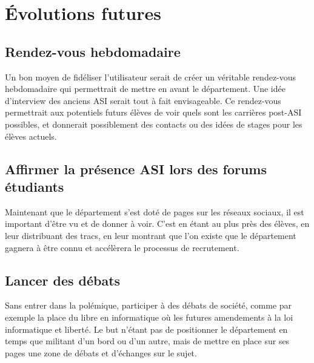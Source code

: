 \section{Évolutions futures}
\subsection{Rendez-vous hebdomadaire}
	Un bon moyen de fidéliser l'utilisateur serait de créer un véritable rendez-vous hebdomadaire qui permettrait de mettre en avant le département. 
	Une idée d'interview des anciens ASI serait tout à fait envisageable. Ce rendez-vous permettrait aux potentiels futurs élèves de voir quels sont les carrières post-ASI possibles, et donnerait possiblement des contacts ou des idées de stages pour les élèves actuels.
	
\subsection{Affirmer la présence ASI lors des forums étudiants}
	Maintenant que le département s'est doté de pages sur les réseaux sociaux, il est important d'être vu et de donner à voir. C'est en étant au plus près des élèves, en leur distribuant des tracs, en leur montrant que l'on existe que le département gagnera à être connu et accélèrera le processus de recrutement.
	
\subsection{Lancer des débats}
	Sans entrer dans la polémique, participer à des débats de société, comme par exemple la place du libre en informatique où les futures amendements à la loi informatique et liberté. Le but n'étant pas de positionner le département en temps que militant d'un bord ou d'un autre, mais de mettre en place sur ses pages une zone de débats et d'échanges sur le sujet.